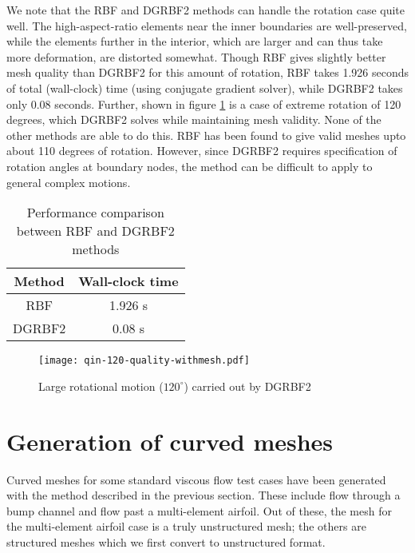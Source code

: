  We note that the RBF and DGRBF2 methods can handle the rotation case quite well. The high-aspect-ratio elements near the inner boundaries are well-preserved, while the elements further in the interior, which are larger and can thus take more deformation, are distorted somewhat. Though RBF gives slightly better mesh quality than DGRBF2 for this amount of rotation, RBF takes 1.926 seconds of total (wall-clock) time (using conjugate gradient solver), while DGRBF2 takes only 0.08 seconds. Further, shown in figure \ref{fig:qin-dgrbf2-120} is a case of extreme rotation of 120 degrees, which DGRBF2 solves while maintaining mesh validity. None of the other methods are able to do this. RBF has been found to give valid meshes upto about 110 degrees of rotation. However, since DGRBF2 requires specification of rotation angles at boundary nodes, the method can be difficult to apply to general complex motions.
 
 \begin{table}[h!]
 	\centering
 \begin{tabular}{|c|c|}
 	\hline
 	Method & Wall-clock time \\
 	\hline
 	RBF   &   1.926 s \\
 	DGRBF2 &  0.08 s \\
 	\hline
 \end{tabular}
 \caption{Performance comparison between RBF and DGRBF2 methods}
 \end{table}
 
 \begin{figure}
 	\centering
 	\texttt{[image: qin-120-quality-withmesh.pdf]}
 	\caption{Large rotational motion ($120^\circ$) carried out by DGRBF2}
 	\label{fig:qin-dgrbf2-120}
 \end{figure}
 
 \FloatBarrier
 
 \section{Generation of curved meshes}
 
 Curved meshes for some standard viscous flow test cases have been generated with the method described in the previous section. These include flow through a bump channel and flow past a multi-element airfoil. Out of these, the mesh for the multi-element airfoil case is a truly unstructured mesh; the others are structured meshes which we first convert to unstructured format.
 
